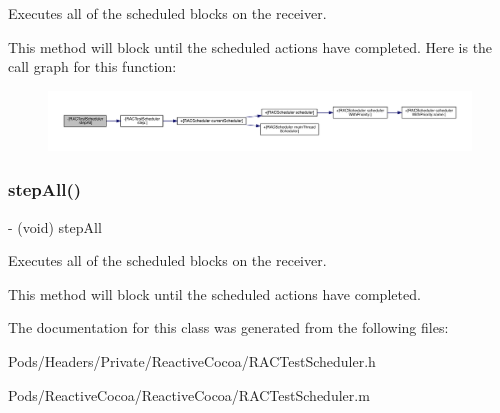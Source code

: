 Executes all of the scheduled blocks on the receiver.

This method will block until the scheduled actions have completed. Here is the call graph for this function\+:\nopagebreak
\begin{figure}[H]
\begin{center}
\leavevmode
\includegraphics[width=350pt]{interface_r_a_c_test_scheduler_a2577a57067b00fa4e08414f168359370_cgraph}
\end{center}
\end{figure}
\mbox{\label{interface_r_a_c_test_scheduler_a2577a57067b00fa4e08414f168359370}} 
\subsubsection{\texorpdfstring{step\+All()}{stepAll()}\hspace{0.1cm}{\footnotesize\ttfamily [3/3]}}
{\footnotesize\ttfamily -\/ (void) step\+All \begin{DoxyParamCaption}{ }\end{DoxyParamCaption}}

Executes all of the scheduled blocks on the receiver.

This method will block until the scheduled actions have completed. 

The documentation for this class was generated from the following files\+:\begin{DoxyCompactItemize}
\item 
Pods/\+Headers/\+Private/\+Reactive\+Cocoa/R\+A\+C\+Test\+Scheduler.\+h\item 
Pods/\+Reactive\+Cocoa/\+Reactive\+Cocoa/R\+A\+C\+Test\+Scheduler.\+m\end{DoxyCompactItemize}
